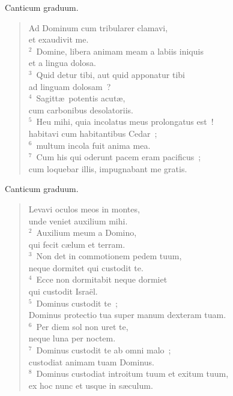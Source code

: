 \bchapter
\lettrine[lines=3,image=true,loversize=0.05,lraise=-0.03]{C}{}anticum graduum. \begin{flushleft}\begin{verse}\vspace{6pt}Ad Dominum cum tribularer clamavi,\\ et exaudivit me.\\
${}^{2}$~Domine, libera animam meam a labiis iniquis\\ et a lingua dolosa.\\
${}^{3}$~Quid detur tibi, aut quid apponatur tibi\\ ad linguam dolosam~?\\
${}^{4}$~Sagitt\ae\ potentis acut\ae ,\\ cum carbonibus desolatoriis.\\
${}^{5}$~Heu mihi, quia incolatus meus prolongatus est~!\\ habitavi cum habitantibus Cedar~;\\
${}^{6}$~multum incola fuit anima mea.\\
${}^{7}$~Cum his qui oderunt pacem eram pacificus~;\\ cum loquebar illis, impugnabant me gratis.\end{verse}\end{flushleft}



\bchapter
\lettrine[lines=3,image=true,loversize=0.05,lraise=-0.03]{C}{}anticum graduum. \begin{flushleft}\begin{verse}\vspace{6pt}Levavi oculos meos in montes,\\ unde veniet auxilium mihi.\\
${}^{2}$~Auxilium meum a Domino,\\ qui fecit c\ae lum et terram.\\
${}^{3}$~Non det in commotionem pedem tuum,\\ neque dormitet qui custodit te.\\
${}^{4}$~Ecce non dormitabit neque dormiet\\ qui custodit Isra\"el.\\
${}^{5}$~Dominus custodit te~;\\ Dominus protectio tua super manum dexteram tuam.\\
${}^{6}$~Per diem sol non uret te,\\ neque luna per noctem.\\
${}^{7}$~Dominus custodit te ab omni malo~;\\ custodiat animam tuam Dominus.\\
${}^{8}$~Dominus custodiat introitum tuum et exitum tuum,\\ ex hoc nunc et usque in s\ae culum.\end{verse}\end{flushleft}



